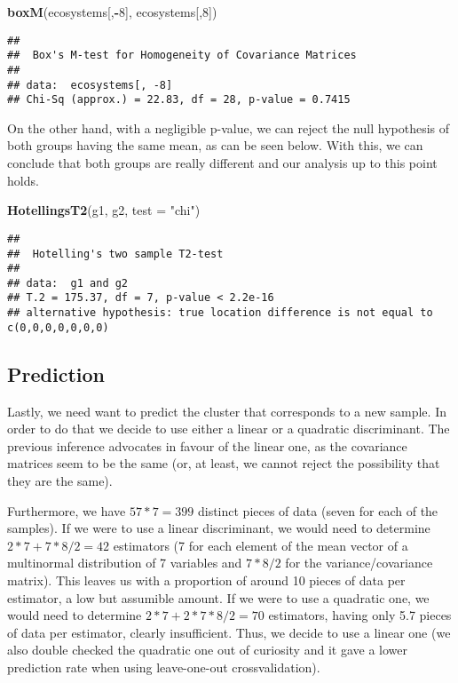 \documentclass[]{article}
\newenvironment{Shaded}{\begin{snugshade}}{\end{snugshade}}
\newcommand{\KeywordTok}[1]{\textcolor[rgb]{0.13,0.29,0.53}{\textbf{#1}}}
\newcommand{\DataTypeTok}[1]{\textcolor[rgb]{0.13,0.29,0.53}{#1}}
\newcommand{\DecValTok}[1]{\textcolor[rgb]{0.00,0.00,0.81}{#1}}
\newcommand{\StringTok}[1]{\textcolor[rgb]{0.31,0.60,0.02}{#1}}
\newcommand{\OperatorTok}[1]{\textcolor[rgb]{0.81,0.36,0.00}{\textbf{#1}}}
\newcommand{\NormalTok}[1]{#1}
\begin{document}
\begin{Shaded}
\begin{Highlighting}[]
\KeywordTok{boxM}\NormalTok{(ecosystems[,}\OperatorTok{-}\DecValTok{8}\NormalTok{], ecosystems[,}\DecValTok{8}\NormalTok{])}
\end{Highlighting}
\end{Shaded}

\begin{verbatim}
## 
##  Box's M-test for Homogeneity of Covariance Matrices
## 
## data:  ecosystems[, -8]
## Chi-Sq (approx.) = 22.83, df = 28, p-value = 0.7415
\end{verbatim}

On the other hand, with a negligible p-value, we can reject the null
hypothesis of both groups having the same mean, as can be seen below.
With this, we can conclude that both groups are really different and our
analysis up to this point holds.

\begin{Shaded}
\begin{Highlighting}[]
\KeywordTok{HotellingsT2}\NormalTok{(g1, g2, }\DataTypeTok{test =} \StringTok{"chi"}\NormalTok{)}
\end{Highlighting}
\end{Shaded}

\begin{verbatim}
## 
##  Hotelling's two sample T2-test
## 
## data:  g1 and g2
## T.2 = 175.37, df = 7, p-value < 2.2e-16
## alternative hypothesis: true location difference is not equal to c(0,0,0,0,0,0,0)
\end{verbatim}

\subsection{Prediction}\label{prediction}

Lastly, we need want to predict the cluster that corresponds to a new
sample. In order to do that we decide to use either a linear or a
quadratic discriminant. The previous inference advocates in favour of
the linear one, as the covariance matrices seem to be the same (or, at
least, we cannot reject the possibility that they are the same).

Furthermore, we have \(57 * 7 = 399\) distinct pieces of data (seven for
each of the samples). If we were to use a linear discriminant, we would
need to determine \(2 * 7 + 7 * 8 / 2 = 42\) estimators (7 for each
element of the mean vector of a multinormal distribution of 7 variables
and \(7 * 8 / 2\) for the variance/covariance matrix). This leaves us
with a proportion of around 10 pieces of data per estimator, a low but
assumible amount. If we were to use a quadratic one, we would need to
determine \(2 * 7 + 2 * 7 * 8 / 2 = 70\) estimators, having only 5.7
pieces of data per estimator, clearly insufficient. Thus, we decide to
use a linear one (we also double checked the quadratic one out of
curiosity and it gave a lower prediction rate when using leave-one-out
crossvalidation).
\end{document}
